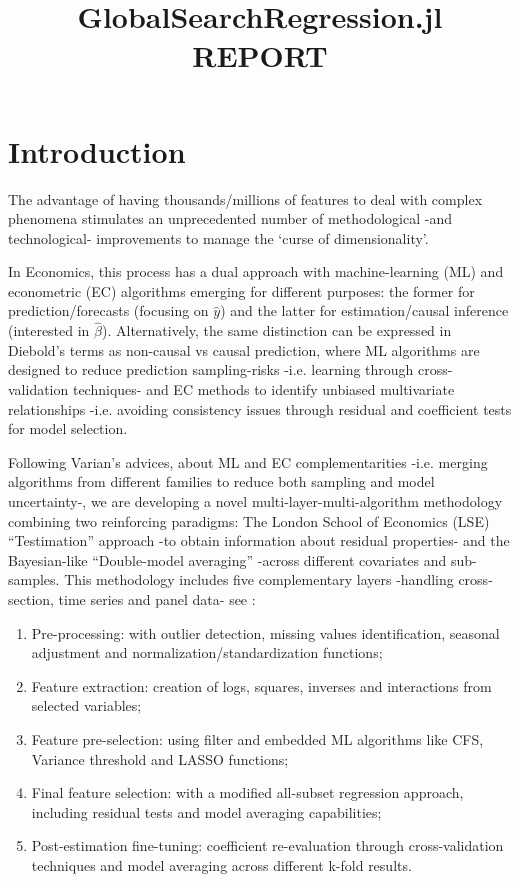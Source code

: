 \documentclass{article}
\title{GlobalSearchRegression.jl \\
       \vspace{5mm} REPORT}
\begin{document}
\maketitle

\vspace{5mm}
\tableofcontents
\clearpage


\section{Introduction}
The advantage of having thousands/millions of features to deal with complex phenomena stimulates an unprecedented number of methodological -and technological- improvements to manage the ‘curse of dimensionality’. 

In Economics, this process has a dual approach with machine-learning (ML) and econometric (EC) algorithms emerging for different purposes: the former for prediction/forecasts (focusing on $\hat{y}$) and the latter for estimation/causal inference (interested in $\hat{\beta}$). Alternatively, the same distinction can be expressed in Diebold’s terms as non-causal vs causal prediction, where ML algorithms are designed to reduce prediction sampling-risks -i.e. learning through cross-validation techniques- and EC methods to identify unbiased multivariate relationships -i.e. avoiding consistency issues through residual and coefficient tests for model selection. 

Following Varian’s advices, about ML and EC complementarities -i.e. merging algorithms from different families to reduce both sampling and model uncertainty-, we are developing a novel multi-layer-multi-algorithm methodology combining two reinforcing paradigms: The London School of Economics (LSE) “Testimation” approach -to obtain information about residual properties- and the Bayesian-like “Double-model averaging” -across different covariates and sub-samples. This methodology includes five complementary layers -handling cross-section, time series and panel data- see \cite{gsreg2019}: 

\begin{enumerate}
    \item Pre-processing: with outlier detection, missing values identification, seasonal adjustment and normalization/standardization functions; 
    
    \item Feature extraction: creation of logs, squares, inverses and interactions from selected variables;
    
    \item Feature pre-selection: using filter and embedded ML algorithms like CFS, Variance threshold and LASSO functions; 
    
    \item Final feature selection: with a modified all-subset regression approach, including residual tests and model averaging capabilities; 
    
    \item Post-estimation fine-tuning: coefficient re-evaluation through cross-validation techniques and model averaging across different k-fold results. 
\end{enumerate}
\end{document}
